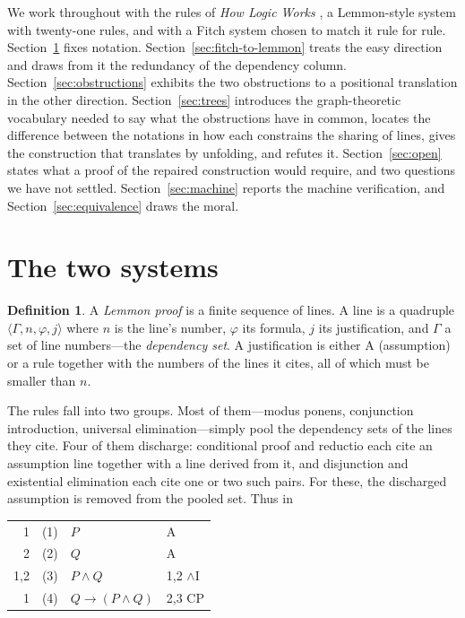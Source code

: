 \documentclass[11pt]{article}
\makeatletter
\theoremstyle{plain}
\theoremstyle{definition}
\newtheorem{definition}[theorem]{Definition}
\theoremstyle{remark}
\newcommand{\dep}[1]{\textup{#1}}
\newenvironment{lemmonproof}
  {\begin{center}\begin{tabular}{@{}r@{\hspace{1.5em}}r@{\hspace{0.6em}}l@{\hspace{2.5em}}l@{}}}
  {\end{tabular}\end{center}}
\makeatother
\begin{document}
We work throughout with the rules of \emph{How Logic Works}
\cite{halvorson2020}, a Lemmon-style system with twenty-one rules, and with a
Fitch system chosen to match it rule for rule. Section~\ref{sec:systems} fixes
notation. Section~\ref{sec:fitch-to-lemmon} treats the easy direction and
draws from it the redundancy of the dependency column.
Section~\ref{sec:obstructions} exhibits the two obstructions to a positional
translation in the other direction. Section~\ref{sec:trees} introduces the
graph-theoretic vocabulary needed to say what the obstructions have in common,
locates the difference between the notations in how each constrains the
sharing of lines, gives the construction that translates by unfolding, and
refutes it. Section~\ref{sec:open} states what a proof of the repaired
construction would require, and two questions we have not settled. Section~\ref{sec:machine} reports the machine verification, and
Section~\ref{sec:equivalence} draws the moral.

\section{The two systems}\label{sec:systems}

\begin{definition}
A \emph{Lemmon proof} is a finite sequence of lines. A line is a quadruple
$\langle \Gamma, n, \varphi, j\rangle$ where $n$ is the line's number,
$\varphi$ its formula, $j$ its justification, and $\Gamma$ a set of line
numbers---the \emph{dependency set}. A justification is either
$\mathrm{A}$ (assumption) or a rule together with the numbers of the lines it
cites, all of which must be smaller than $n$.
\end{definition}

The rules fall into two groups. Most of them---modus ponens, conjunction
introduction, universal elimination---simply pool the dependency sets of the
lines they cite. Four of them discharge: conditional proof and reductio each
cite an assumption line together with a line derived from it, and disjunction
and existential elimination each cite one or two such pairs. For these, the
discharged assumption is removed from the pooled set. Thus in

\begin{lemmonproof}
\dep{1}   & (1) & $P$              & A \\
\dep{2}   & (2) & $Q$              & A \\
\dep{1,2} & (3) & $P \wedge Q$     & 1,2 $\wedge$I \\
\dep{1}   & (4) & $Q \to (P \wedge Q)$ & 2,3 CP \\
\end{lemmonproof}
\end{document}
